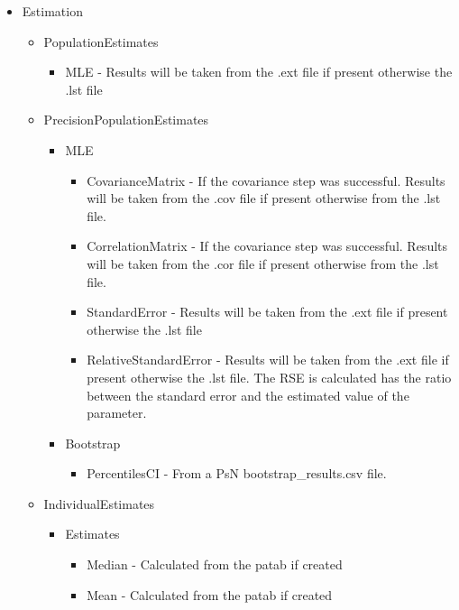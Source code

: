 \begin{itemize}
    \item Estimation
        \begin{itemize}
            \item PopulationEstimates
            \begin{itemize}
                \item MLE - Results will be taken from the .ext file if present otherwise the .lst file
            \end{itemize}
            \item PrecisionPopulationEstimates
            \begin{itemize}
                \item MLE
                \begin{itemize}
                    \item CovarianceMatrix - If the covariance step was successful. Results will be taken from the .cov file if present otherwise from the .lst file.
                    \item CorrelationMatrix - If the covariance step was successful. Results will be taken from the .cor file if present otherwise from the .lst file.
                    \item StandardError - Results will be taken from the .ext file if present otherwise the .lst file
                    \item RelativeStandardError - Results will be taken from the .ext file if present otherwise the .lst file. The RSE is calculated has the ratio between the standard error and the estimated value of the parameter.
                \end{itemize}
                \item Bootstrap
                \begin{itemize}
                    \item PercentilesCI - From a PsN bootstrap\_results.csv file.
                \end{itemize}
            \end{itemize}
            \item IndividualEstimates
            \begin{itemize}
                \item Estimates
                \begin{itemize}
                    \item Median - Calculated from the patab if created
                    \item Mean - Calculated from the patab if created

\end{itemize}
\end{itemize}
\end{itemize}
\end{itemize}
